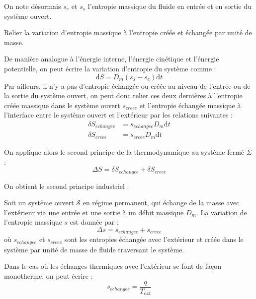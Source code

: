 \documentclass[11pt,fleqn]{book} %
\newcommand{\dd}{\mathrm{d}}
\begin{document}
On note désormais $s_e$ et $s_s$ l'entropie massique du fluide en entrée et en sortie du système ouvert.

\begin{capex}
Relier la variation d'entropie massique à l'entropie créée et échangée par unité de masse.
\end{capex}

\begin{solution}
De manière analogue à l'énergie interne, l'énergie cinétique et l'énergie potentielle, on peut écrire la variation d'entropie du système comme :
\begin{equation}
    \dd S = D_m (s_s - s_e) \dd t
\end{equation}
Par ailleurs, il n'y a pas d'entropie échangée ou créée au niveau de l'entrée ou de la sortie du système ouvert, on peut donc relier ces deux dernières à l'entropie créée massique dans le système ouvert $s_{creee}$ et l'entropie échangée massique à l'interface entre le système ouvert et l'extérieur par les relations suivantes :
\begin{align}
    \delta S_{echangee} &= s_{echangee} D_m \dd t\\
    \delta S_{creee} &= s_{creee} D_m \dd t
\end{align}

On applique alors le second principe de la thermodynamique au système fermé $\Sigma$ :
\begin{equation}
    \Delta S = \delta S_{echangee} + \delta S_{creee} 
\end{equation}
\end{solution}

On obtient le second principe industriel :
\begin{theorem}
    Soit un système ouvert $\mathcal{S}$ en régime permanent, qui échange de la masse avec l'extérieur via une entrée et une sortie à un débit massique $D_m$. La variation de l'entropie massique $s$ est donnée par :
    \begin{equation}
        \Delta s = s_{echangee} + s_{creee}
    \end{equation}
    où $s_{echangee}$ et $s_{creee}$ sont les entropies échangée avec l'extérieur et créée dans le système par unité de masse de fluide traversant le système.
\end{theorem}

\begin{remark}
    Dans le cas où les échanges thermiques avec l'extérieur se font de façon monotherme, on peut écrire :
    \begin{equation}
        s_{echangee} = \frac{q}{T_{ext}}
    \end{equation}
\end{remark}
\end{document}
